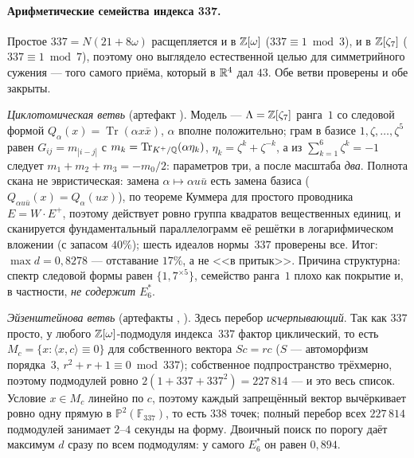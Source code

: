\paragraph{Арифметические семейства индекса 337.} Простое $337=N(21+8\omega)$
расщепляется и в $\mathbb{Z}[\omega]$ ($337\equiv1\bmod3$), и в $\mathbb{Z}[\zeta_7]$
($337\equiv1\bmod7$), поэтому оно выглядело естественной целью для
симметрийного сужения --- того самого приёма, который в $\mathbb{R}^4$ дал $43$.
Обе ветви проверены и обе закрыты.

\emph{Циклотомическая ветвь} (артефакт
). Модель ---
$\Lambda=\mathbb{Z}[\zeta_7]$ ранга~$1$ со следовой формой
$Q_\alpha(x)=\operatorname{Tr}(\alpha x\bar x)$, $\alpha$ вполне положительно;
грам в базисе $1,\zeta,\dots,\zeta^5$ равен $G_{ij}=m_{|i-j|}$ с
$m_k=\operatorname{Tr}_{K^{+}/\mathbb{Q}}(\alpha\eta_k)$, $\eta_k=\zeta^k+\zeta^{-k}$,
а из $\sum_{k=1}^{6}\zeta^k=-1$ следует $m_1+m_2+m_3=-m_0/2$: параметров три, а
после масштаба \emph{два}. Полнота скана не эвристическая: замена
$\alpha\mapsto\alpha u\bar u$ есть замена базиса ($Q_{\alpha u\bar u}(x)=
Q_\alpha(ux)$), по теореме Куммера для простого проводника $E=W\cdot E^{+}$,
поэтому действует ровно группа квадратов вещественных единиц, и сканируется
фундаментальный параллелограмм её решётки в логарифмическом вложении (с запасом
$40\%$); шесть идеалов нормы~$337$ проверены все. Итог: $\max d=0{,}8278$ ---
отставание $17\%$, а не <<в притык>>. Причина структурна: спектр следовой формы
равен $\{1,7^{\times5}\}$, семейство ранга~$1$ плохо как покрытие и, в
частности, \emph{не содержит} $E_6^*$.

\emph{Эйзенштейнова ветвь} (артефакты
,
).
Здесь перебор \emph{исчерпывающий}. Так как $337$ просто, у любого
$\mathbb{Z}[\omega]$-подмодуля индекса~$337$ фактор циклический, то есть
$M_c=\{x:\langle x,c\rangle\equiv0\}$ для собственного вектора $Sc=rc$
($S$ --- автоморфизм порядка~$3$, $r^2+r+1\equiv0\bmod337$); собственное
подпространство трёхмерно, поэтому подмодулей ровно
$2(1+337+337^2)=227\,814$ --- и это весь список. Условие $x\in M_c$ линейно по
$c$, поэтому каждый запрещённый вектор вычёркивает ровно одну прямую в
$\mathbb{P}^2(\mathbb{F}_{337})$, то есть $338$ точек; полный перебор всех $227\,814$
подмодулей занимает $2$--$4$ секунды на форму. Двоичный поиск по порогу даёт
максимум $d$ сразу по всем подмодулям: у самого $E_6^*$ он равен $0{,}894$.

